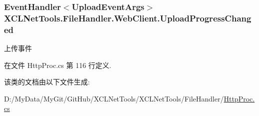\hypertarget{class_x_c_l_net_tools_1_1_file_handler_1_1_web_client_abe950fa329508b4c52e3181aeb97585f}{
\subsubsection[{Upload\-Progress\-Changed}]{\setlength{\rightskip}{0pt plus 5cm}Event\-Handler$<${\bf Upload\-Event\-Args}$>$ X\-C\-L\-Net\-Tools.\-File\-Handler.\-Web\-Client.\-Upload\-Progress\-Changed}}\label{class_x_c_l_net_tools_1_1_file_handler_1_1_web_client_abe950fa329508b4c52e3181aeb97585f}


上传事件 



在文件 Http\-Proc.\-cs 第 116 行定义.



该类的文档由以下文件生成\-:\begin{DoxyCompactItemize}
\item 
D\-:/\-My\-Data/\-My\-Git/\-Git\-Hub/\-X\-C\-L\-Net\-Tools/\-X\-C\-L\-Net\-Tools/\-File\-Handler/\hyperlink{_http_proc_8cs}{Http\-Proc.\-cs}\end{DoxyCompactItemize}

